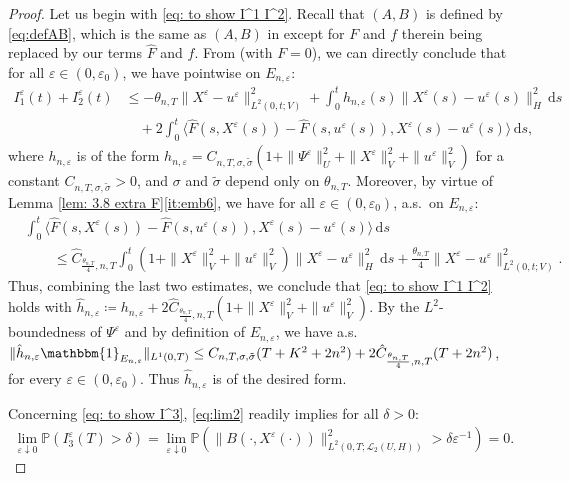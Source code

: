 \documentclass{amsart}
\newcommand{\dd}{\,\mathrm{d}}
\newcommand{\UH}{\mathscr{L}_2(U,H)}
\newcommand{\one}{\mathbbm{1}}
\newcommand{\<}{\langle}
\newcommand{\?}{\rangle}
\newcommand{\ceqq}{\coloneqq}
\theoremstyle{plain}
\theoremstyle{remark}
\theoremstyle{plain}
\numberwithin{equation}{section}
\renewcommand{\P}{\mathbb{P}}
\newcommand{\eps}{\varepsilon}
\begin{document}
\begin{proof}
    Let us begin with \eqref{eq: to show I^1 I^2}. Recall that  $(A,B)$ is defined by \eqref{eq:defAB}, which is the same as $(A,B)$ in \cite{TV24} except for $F$ and $f$ therein being replaced by our terms $\hat{F}$ and $\hat{f}$.  
   From \cite[(4.32)--(4.36)]{TV24} (with $F=0$), we can directly conclude that for all $\eps\in(0,\eps_0)$, we have pointwise  on $E_{n,\eps}$:
    \begin{align*}
     {I}_1^\eps(t)+{I}_2^\eps(t)&\leq -\theta_{n,T}\|X^\eps-u^{\eps}\|_{L^2(0,t;V)}^2+\int_0^t h_{n,\eps}(s)\|X^\eps(s)-u^{\eps}(s)\|_H^2\dd s\\
     & \quad+2\int_0^t \<\hat{F}(s,X^\eps(s))-\hat{F}(s,u^\eps(s)),X^\eps(s)-u^\eps(s)\?\dd s,
    \end{align*}
    where $h_{n,\eps}$ is of the form $
    h_{n,\eps} = C_{n,T,\sigma,\tilde{\sigma}}\left(1+\|\Psi^\eps\|_U^2+\|X^\eps\|_V^2+\|u^{\eps}\|_V^2\right)$ 
    for a constant $C_{n,T,\sigma,\tilde{\sigma}}>0$, and $\sigma$ and $\tilde{\sigma}$ depend only on $\theta_{n,T}$. Moreover, by virtue of Lemma \ref{lem: 3.8 extra F}\ref{it:emb6}, we have  for all $\eps\in(0,\eps_0)$, a.s.\ on $E_{n,\eps}$:
    \begin{align*}
    &\int_0^t \<\hat{F}(s,X^\eps(s))-\hat{F}(s,u^\eps(s)),X^\eps(s)-u^\eps(s)\?\dd s\\
    &\qquad\leq \hat{C}_{\frac{\theta_{n,T}}{4},n,T} \int_0^t  (1+\|X^\eps\|_V^2+ \|u^\eps\|_V^2)\|X^\eps-u^\eps\|_H^2\dd s+\frac{\theta_{n,T}}{4}\|X^\eps-u^\eps\|_{L^2(0,t;V)}^2.
    \end{align*}
    Thus, combining the last two estimates, we conclude that \eqref{eq: to show I^1 I^2} holds with $\hat{h}_{n,\eps}\ceqq h_{n,\eps}+2\hat{C}_{\frac{\theta_{n,T}}{4},n,T} (1+\|X^\eps\|_V^2+ \|u^\eps\|_V^2)$. 
    By the $L^2$-boundedness of $\Psi^\eps$ and by definition of $E_{n,\eps}$, we have a.s.\  $\|\hat{h}_{n,\eps}\one_{E_{n,\eps}}\|_{L^1(0,T)}\leq C_{n,T,\sigma,\tilde{\sigma}}(T+K^2+2n^2)+2\hat{C}_{\frac{\theta_{n,T}}{4},n,T} (T+2n^2)$,  for every $\eps\in(0,\eps_0)$. Thus  $\hat{h}_{n,\eps}$ is of the desired form.


    Concerning \eqref{eq: to show I^3},  \eqref{eq:lim2} readily implies for all  $\delta>0$:
    \begin{align*}
    \lim_{\eps\downarrow 0}\P({I}_3^\eps(T)>\delta)
    =\lim_{\eps\downarrow 0}\P( \| B(\cdot,X^\eps(\cdot))\|_{L^2(0,T;\UH)}^2>{\delta}{\eps}^{-1})=0.
    \end{align*}
    

\end{proof}
\end{document}
